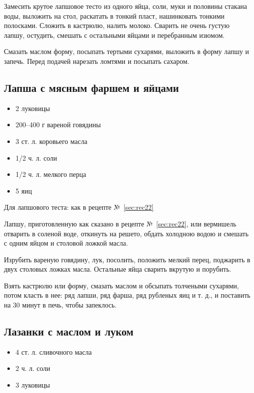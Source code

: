 Замесить крутое лапшовое тесто из одного яйца, соли, муки и половины стакана воды, выложить на стол, раскатать в тонкий пласт, нашинковать тонкими полосками. Сложить в кастрюлю, налить молоко. Сварить не очень густую лапшу, остудить, смешать с остальными яйцами и перебранным изюмом.

Смазать маслом форму, посыпать тертыми сухарями, выложить в форму лапшу и запечь. Перед подачей нарезать ломтями и посыпать сахаром.

\subsection{Лапша с мясным фаршем и яйцами}

\begin{itemize}
	\item 2 луковицы
    \item 200–400 г вареной говядины 
    \item 3 ст. л. коровьего масла
    \item 1/2 ч. л. соли 
    \item 1/2 ч. л. мелкого перца
    \item 5 яиц
\end{itemize}

Для лапшового теста: как в рецепте №~\ref{sec:rec22}

Лапшу, приготовленную как сказано в рецепте №~\ref{sec:rec22}, или вермишель отварить в соленой воде, откинуть на решето, обдать холодною водою и смешать с одним яйцом и столовой ложкой масла.

Изрубить вареную говядину, лук, посолить, положить мелкий перец, поджарить в двух столовых ложках масла. Остальные яйца сварить вкрутую и порубить.

Взять кастрюлю или форму, смазать маслом и обсыпать толчеными сухарями, потом класть в нее: ряд лапши, ряд фарша, ряд рубленых яиц и т. д., и поставить на 30 минут в печь, чтобы запеклось.

\subsection{Лазанки с маслом и луком}

\begin{itemize}
	\item 4 ст. л. сливочного масла 
    \item 2 ч. л. соли 
    \item 3 луковицы
\end{itemize}

